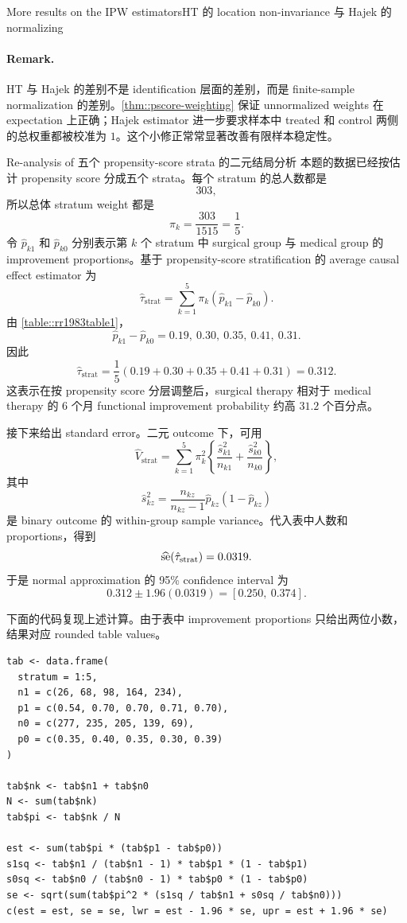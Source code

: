 \begin{exercisesolution}{More results on the IPW estimators}{HT 的 location non-invariance 与 Hajek 的 normalizing}
\paragraph{Remark.}
HT 与 Hajek 的差别不是 identification 层面的差别，而是 finite-sample normalization 的差别。\cref{thm::pscore-weighting} 保证 unnormalized weights 在 expectation 上正确；Hajek estimator 进一步要求样本中 treated 和 control 两侧的总权重都被校准为 $1$。这个小修正常常显著改善有限样本稳定性。
\end{exercisesolution}

\begin{exercisesolution}{Re-analysis of \citet{Rosenbaum::1983JRSSB}}{五个 propensity-score strata 的二元结局分析}
本题的数据已经按估计 propensity score 分成五个 strata。每个 stratum 的总人数都是
\[
303,
\]
所以总体 stratum weight 都是
\[
\pi_k=\frac{303}{1515}=\frac{1}{5}.
\]
令 $\hat p_{k1}$ 和 $\hat p_{k0}$ 分别表示第 $k$ 个 stratum 中 surgical group 与 medical group 的 improvement proportions。基于 propensity-score stratification 的 average causal effect estimator 为
\[
\hat\tau_{\mathrm{strat}}
=\sum_{k=1}^5\pi_k(\hat p_{k1}-\hat p_{k0}).
\]
由 \cref{table::rr1983table1}，
\[
\hat p_{k1}-\hat p_{k0}
=0.19,\ 0.30,\ 0.35,\ 0.41,\ 0.31.
\]
因此
\[
\hat\tau_{\mathrm{strat}}
=\frac{1}{5}(0.19+0.30+0.35+0.41+0.31)
=0.312.
\]
这表示在按 propensity score 分层调整后，surgical therapy 相对于 medical therapy 的 6 个月 functional improvement probability 约高 $31.2$ 个百分点。

接下来给出 standard error。二元 outcome 下，可用
\[
\hat V_{\mathrm{strat}}
=\sum_{k=1}^5\pi_k^2
\left\{
\frac{\hat s_{k1}^2}{n_{k1}}
+\frac{\hat s_{k0}^2}{n_{k0}}
\right\},
\]
其中
\[
\hat s_{kz}^2=\frac{n_{kz}}{n_{kz}-1}\hat p_{kz}(1-\hat p_{kz})
\]
是 binary outcome 的 within-group sample variance。代入表中人数和 proportions，得到
\[
\widehat{\textup{se}}(\hat\tau_{\mathrm{strat}})=0.0319.
\]
于是 normal approximation 的 95\% confidence interval 为
\[
0.312\pm 1.96(0.0319)=[0.250,\ 0.374].
\]

下面的代码复现上述计算。由于表中 improvement proportions 只给出两位小数，结果对应 rounded table values。
\begin{lstlisting}
tab <- data.frame(
  stratum = 1:5,
  n1 = c(26, 68, 98, 164, 234),
  p1 = c(0.54, 0.70, 0.70, 0.71, 0.70),
  n0 = c(277, 235, 205, 139, 69),
  p0 = c(0.35, 0.40, 0.35, 0.30, 0.39)
)

tab$nk <- tab$n1 + tab$n0
N <- sum(tab$nk)
tab$pi <- tab$nk / N

est <- sum(tab$pi * (tab$p1 - tab$p0))
s1sq <- tab$n1 / (tab$n1 - 1) * tab$p1 * (1 - tab$p1)
s0sq <- tab$n0 / (tab$n0 - 1) * tab$p0 * (1 - tab$p0)
se <- sqrt(sum(tab$pi^2 * (s1sq / tab$n1 + s0sq / tab$n0)))
c(est = est, se = se, lwr = est - 1.96 * se, upr = est + 1.96 * se)
\end{lstlisting}


\end{exercisesolution}
